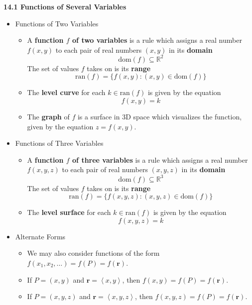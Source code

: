 \documentclass[12pt]{article}
\renewcommand{\vec}[1]{\mathbf{#1}}
\newcommand{\<}{\left<}
\renewcommand{\>}{\right>}
\begin{document}



\newpage

\centerline{\bf 14.1 Functions of Several Variables}

\begin{itemize}

  \item Functions of Two Variables
    \begin{itemize}
      \item A \textbf{function $f$ of two variables} is a rule which assigns a real number $f(x,y)$ to each pair of real numbers $(x,y)$ in its \textbf{domain} \[\text{dom}(f)\subseteq \mathbb{R}^2\] The set of values $f$ takes on is its \textbf{range} \[\text{ran}(f) = \{f(x,y):(x,y)\in\text{dom}(f)\}\]
      \item The \textbf{level curve} for each $k\in\text{ran}(f)$ is given by the equation \[f(x,y)=k\]
      \item The \textbf{graph} of $f$ is a surface in 3D space which visualizes the function, given by the equation $z=f(x,y)$.
    \end{itemize}

  \item Functions of Three Variables
    \begin{itemize}
      \item A \textbf{function $f$ of three variables} is a rule which assigns a real number $f(x,y,z)$ to each pair of real numbers $(x,y,z)$ in its \textbf{domain} \[\text{dom}(f)\subseteq \mathbb{R}^3\] The set of values $f$ takes on is its \textbf{range} \[\text{ran}(f) = \{f(x,y,z):(x,y,z)\in\text{dom}(f)\}\]
      \item The \textbf{level surface} for each $k\in\text{ran}(f)$ is given by the equation \[f(x,y,z)=k\]
    \end{itemize}

  \item Alternate Forms
    \begin{itemize}
      \item We may also consider functions of the form $f(x_1,x_2,\dots)=f(P)=f(\vec{r})$.
      \item If $P=(x,y)$ and $\vec{r}=\<x,y\>$, then $f(x,y)=f(P)=f(\vec{r})$. 
      \item If $P=(x,y,z)$ and $\vec{r}=\<x,y,z\>$, then $f(x,y,z)=f(P)=f(\vec{r})$. 
    \end{itemize}




\end{itemize}
\end{document}

